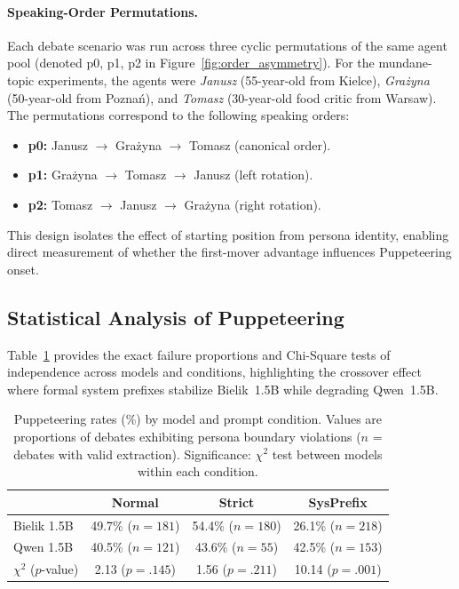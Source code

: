 \documentclass[twoside,11pt]{article}
\begin{document}
\paragraph{Speaking-Order Permutations.}
Each debate scenario was run across three cyclic permutations of the same agent pool (denoted p0, p1, p2 in Figure~\ref{fig:order_asymmetry}). For the mundane-topic experiments, the agents were \textit{Janusz} (55-year-old from Kielce), \textit{Gra\.zyna} (50-year-old from Pozna\'n), and \textit{Tomasz} (30-year-old food critic from Warsaw). The permutations correspond to the following speaking orders:
\begin{itemize}
    \item \textbf{p0:} Janusz $\to$ Gra\.zyna $\to$ Tomasz (canonical order).
    \item \textbf{p1:} Gra\.zyna $\to$ Tomasz $\to$ Janusz (left rotation).
    \item \textbf{p2:} Tomasz $\to$ Janusz $\to$ Gra\.zyna (right rotation).
\end{itemize}
This design isolates the effect of starting position from persona identity, enabling direct measurement of whether the first-mover advantage influences Puppeteering onset.

\subsection{Statistical Analysis of Puppeteering}
\label{app:puppeteering_stats}

Table~\ref{tab:puppeteering} provides the exact failure proportions and Chi-Square tests of independence across models and conditions, highlighting the crossover effect where formal system prefixes stabilize Bielik~1.5B while degrading Qwen~1.5B.

\begin{table}[htbp]
\centering
\caption{Puppeteering rates (\%) by model and prompt condition. Values are proportions of debates exhibiting persona boundary violations ($n$ = debates with valid extraction). Significance: $\chi^2$ test between models within each condition.}
\label{tab:puppeteering}
\smallskip
\begin{tabular}{lccc}
\toprule
& \textbf{Normal} & \textbf{Strict} & \textbf{SysPrefix} \\
\midrule
Bielik 1.5B & 49.7\% ($n{=}181$) & 54.4\% ($n{=}180$) & 26.1\% ($n{=}218$) \\
Qwen 1.5B   & 40.5\% ($n{=}121$) & 43.6\% ($n{=}55$)  & 42.5\% ($n{=}153$) \\
\midrule
$\chi^2$ ($p$-value) & 2.13 ($p{=}.145$) & 1.56 ($p{=}.211$) & 10.14 ($p{=}.001$) \\
\bottomrule
\end{tabular}
\end{table}
\end{document}
